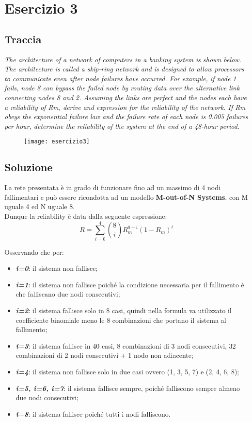\clearpage

\section{Esercizio 3}
\subsection{Traccia}
\textit{The architecture of a network of computers in a banking system is shown
below. The architecture is called a skip-ring network and is designed to allow
processors to communicate even after node failures have occurred. For example,
if node 1 fails, node 8 can bypass the failed node by routing data over the
alternative link connecting nodes 8 and 2. Assuming the links are perfect and
the nodes each have a reliability of Rm, derive and expression for the reliability
of the network. If Rm obeys the exponential failure law and the failure rate of
each node is 0.005 failures per hour, determine the reliability of the system
at the end of a 48-hour period.}
\begin{figure}[!htbp]
  \centering
  \texttt{[image: esercizio3]}
\end{figure}

\clearpage
\subsection{Soluzione}

La rete presentata è in grado di funzionare fino ad un massimo di 4 nodi fallimentari
e può essere ricondotta ad un modello \textbf{M-out-of-N Systems}, con M uguale 4
ed N uguale 8.\\
Dunque la reliability è data dalla seguente espressione:
$$ R = \sum_{i=0}^{4}{\binom{8}{i}R_m^{8-i}(1-R_m)^i}$$

Osservando che per:
\begin{itemize}
  \item \textbf{\textit{i=0}}: il sistema non fallisce;
  \item \textbf{\textit{i=1}}: il sistema non fallisce poiché la condizione necessaria
  per il fallimento è che falliscano due nodi consecutivi;
  \item \textbf{\textit{i=2}}: il sistema fallisce solo in 8 casi, quindi
  nella formula va utilizzato il coefficiente binomiale meno le 8 combinazioni che
  portano il sistema al fallimento;
  \item \textbf{\textit{i=3}}: il sistema fallisce in 40 casi, 8 combinazioni di 3 nodi consecutivi, 32 combinazioni
  di 2 nodi consecutivi + 1 nodo non adiacente;
  \item \textbf{\textit{i=4}}: il sistema non fallisce solo in due casi ovvero
  (1, 3, 5, 7) e (2, 4, 6, 8);
  \item \textbf{\textit{i=5, i=6, i=7}}: il sistema fallisce sempre, poiché
  falliscono sempre almeno due nodi consecutivi;
  \item \textbf{\textit{i=8}}: il sistema fallisce poiché tutti i nodi falliscono.
\end{itemize}

